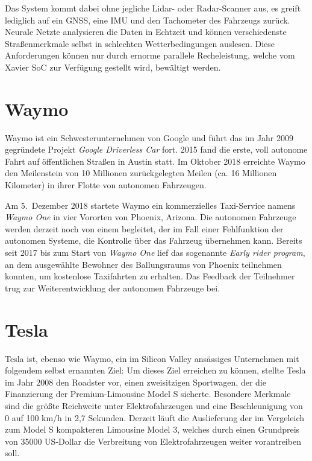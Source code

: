 Das System kommt dabei ohne jegliche \acs{Lidar}- oder \acs{Radar}-Scanner aus, es greift lediglich auf ein \ac{GNSS}, eine \ac{IMU} und den Tachometer des Fahrzeugs zurück. Neurale Netzte analysieren die Daten in Echtzeit und können verschiedenste Straßenmerkmale selbst in schlechten Wetterbedingungen auslesen. Diese Anforderungen können nur durch ernorme parallele Recheleistung, welche vom Xavier \ac{SoC} zur Verfügung gestellt wird, bewältigt werden.


\section{Waymo}

Waymo ist ein Schwesterunternehmen von Google und führt das im Jahr 2009 gegründete Projekt \emph{Google Driverless Car} fort. 2015 fand die erste, voll autonome Fahrt auf öffentlichen Straßen in Austin statt. Im Oktober 2018 erreichte Waymo den Meilenstein von 10 Millionen zurückgelegten Meilen (ca. 16 Millionen Kilometer) in ihrer Flotte von autonomen Fahrzeugen.

Am 5.\ Dezember 2018 startete Waymo ein kommerzielles Taxi-Service namens \emph{Waymo One} in vier Vororten von Phoenix, Arizona. Die autonomen Fahrzeuge werden derzeit noch von einem  begleitet, der im Fall einer Fehlfunktion der autonomen Systeme, die Kontrolle über das Fahrzeug übernehmen kann.
 Bereits seit 2017 bis zum Start von \emph{Waymo One} lief das sogenannte \emph{Early rider program}, an dem ausgewählte Bewohner des Ballungsraums von Phoenix teilnehmen konnten, um kostenlose Taxifahrten zu erhalten. Das Feedback der Teilnehmer trug zur Weiterentwicklung der autonomen Fahrzeuge bei.


\section{Tesla}

Tesla ist, ebenso wie Waymo, ein im Silicon Valley ansässiges Unternehmen mit folgendem selbst ernannten Ziel:  Um dieses Ziel erreichen zu können, stellte Tesla im Jahr 2008 den Roadster vor, einen zweisitzigen Sportwagen, der die Finanzierung der Premium-Limousine Model S sicherte. Besondere Merkmale sind die größte Reichweite unter Elektrofahrzeugen und eine Beschleunigung von 0 auf 100 \si[per-mode=symbol]{\kilo\metre\per\hour} in 2,7 Sekunden. Derzeit läuft die Auslieferung der im Vergeleich zum Model S kompakteren Limousine Model 3, welches durch einen Grundpreis von \num{35000} US-Dollar die Verbreitung von Elektrofahrzeugen weiter vorantreiben soll.

